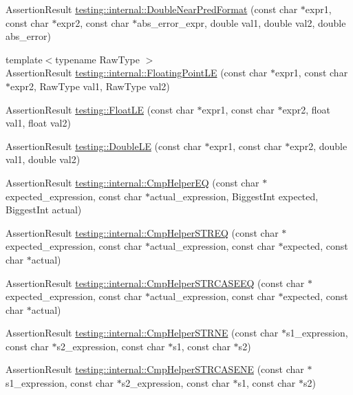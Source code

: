 \begin{DoxyCompactItemize}
\item 
Assertion\-Result \hyperlink{namespacetesting_1_1internal_a4f70b36c624b54c2362aeecc2f05ee8c}{testing\-::internal\-::\-Double\-Near\-Pred\-Format} (const char $\ast$expr1, const char $\ast$expr2, const char $\ast$abs\-\_\-error\-\_\-expr, double val1, double val2, double abs\-\_\-error)
\item 
{\footnotesize template$<$typename Raw\-Type $>$ }\\Assertion\-Result \hyperlink{namespacetesting_1_1internal_a17b52b6b1f81f6dcad5cc4d12e5173a6}{testing\-::internal\-::\-Floating\-Point\-L\-E} (const char $\ast$expr1, const char $\ast$expr2, Raw\-Type val1, Raw\-Type val2)
\item 
Assertion\-Result \hyperlink{namespacetesting_a2c9a2a391c72a7b02ea3024586e33af0}{testing\-::\-Float\-L\-E} (const char $\ast$expr1, const char $\ast$expr2, float val1, float val2)
\item 
Assertion\-Result \hyperlink{namespacetesting_ae10e2bb304b74abd1b06a2d912a8b43b}{testing\-::\-Double\-L\-E} (const char $\ast$expr1, const char $\ast$expr2, double val1, double val2)
\item 
Assertion\-Result \hyperlink{namespacetesting_1_1internal_ae82c79cea2973bbbfbd0f2aca7a6f349}{testing\-::internal\-::\-Cmp\-Helper\-E\-Q} (const char $\ast$expected\-\_\-expression, const char $\ast$actual\-\_\-expression, Biggest\-Int expected, Biggest\-Int actual)
\item 
Assertion\-Result \hyperlink{namespacetesting_1_1internal_a11ff4bc46dddd8bb07c0e247a603695d}{testing\-::internal\-::\-Cmp\-Helper\-S\-T\-R\-E\-Q} (const char $\ast$expected\-\_\-expression, const char $\ast$actual\-\_\-expression, const char $\ast$expected, const char $\ast$actual)
\item 
Assertion\-Result \hyperlink{namespacetesting_1_1internal_a802d9586d870a90e6a850953c167654d}{testing\-::internal\-::\-Cmp\-Helper\-S\-T\-R\-C\-A\-S\-E\-E\-Q} (const char $\ast$expected\-\_\-expression, const char $\ast$actual\-\_\-expression, const char $\ast$expected, const char $\ast$actual)
\item 
Assertion\-Result \hyperlink{namespacetesting_1_1internal_af2d31c77ce73e1003a64bd7ca3564bbe}{testing\-::internal\-::\-Cmp\-Helper\-S\-T\-R\-N\-E} (const char $\ast$s1\-\_\-expression, const char $\ast$s2\-\_\-expression, const char $\ast$s1, const char $\ast$s2)
\item 
Assertion\-Result \hyperlink{namespacetesting_1_1internal_a7e31d489f06ab8f6a81a7729f0c377e7}{testing\-::internal\-::\-Cmp\-Helper\-S\-T\-R\-C\-A\-S\-E\-N\-E} (const char $\ast$s1\-\_\-expression, const char $\ast$s2\-\_\-expression, const char $\ast$s1, const char $\ast$s2)

\end{DoxyCompactItemize}
